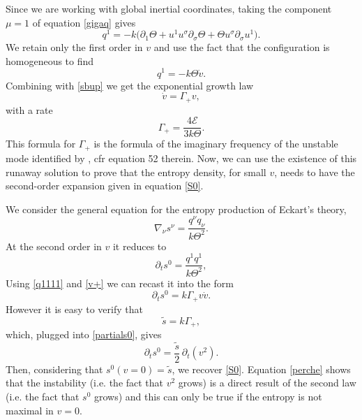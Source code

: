\documentclass[a4paper, amsfonts, amssymb, amsmath, reprint, showkeys, nofootinbib, twoside]{revtex4-1}
\begin{document}
Since we are working with global inertial coordinates, taking the component $\mu=1$ of equation \eqref{gigaq} gives
\begin{equation}
q^1 = -k \bigg( \partial_1 \Theta + u^1 u^\sigma \partial_\sigma \Theta + \Theta u^\sigma \partial_\sigma u^1  \bigg).
\end{equation}
We retain only the first order in $v$ and use the fact that the configuration is homogeneous to find
\begin{equation}\label{q1111}
q^1 = -k\Theta \dot{v}.
\end{equation}
Combining with \eqref{sbup} we get the exponential growth law
\begin{equation}\label{v+}
\dot{v} = \Gamma_+ v, 
\end{equation}
with a rate
\begin{equation}
\Gamma_+ = \dfrac{4\mathcal{E}}{3k\Theta}.
\end{equation}
This formula for $\Gamma_+$ is the formula of the imaginary frequency of the unstable mode identified by \citet{Hiscock_Insatibility_first_order}, cfr equation 52 therein. 
Now, we can use the existence of this runaway solution to prove that the entropy density, for small $v$, needs to have the second-order expansion given in equation \eqref{S0}. 

We consider the general equation for the entropy production of Eckart's theory, 
\begin{equation}\label{laproducoio}
 \nabla_\nu s^\nu = \dfrac{q^\nu q_\nu}{k\Theta^2}.
\end{equation} 
At the second order in $v$ it reduces to
\begin{equation}
\partial_t s^0 = \dfrac{q^1 q^1}{k\Theta^2},
\end{equation}
Using \eqref{q1111} and \eqref{v+} we can recast it into the form
\begin{equation}\label{partials0}
\partial_t s^0 = k\Gamma_+ v \dot{v}.
\end{equation}
However it is easy to verify that
\begin{equation}
\tilde{s} = k\Gamma_+,
\end{equation}
which, plugged into \eqref{partials0}, gives
\begin{equation}\label{perche}
\partial_t s^0 = \dfrac{\tilde{s}}{2} \, \partial_t (v^2).
\end{equation}
Then, considering that $s^0(v=0)=\tilde{s}$, we recover \eqref{S0}. Equation \eqref{perche} shows that the instability (i.e. the fact that $v^2$ grows) is a direct result of the second law (i.e. the fact that $s^0$ grows) and this can only be true if the entropy is not maximal in $v=0$. 
\end{document}
